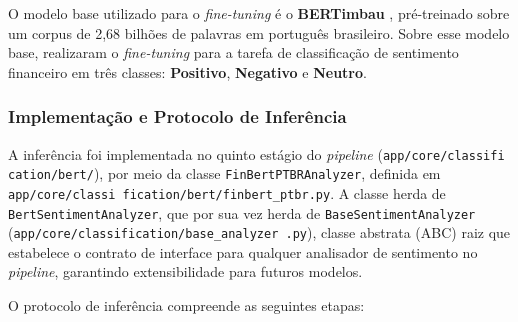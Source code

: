O modelo base utilizado para o \textit{fine-tuning} é o \textbf{BERTimbau} \cite{souza2020}, pré-treinado sobre um corpus de 2,68 bilhões de palavras em português brasileiro. Sobre esse modelo base,  realizaram o \textit{fine-tuning} para a tarefa de classificação de sentimento financeiro em três classes: \textbf{Positivo}, \textbf{Negativo} e \textbf{Neutro}.

\subsubsection{Implementação e Protocolo de Inferência}
\label{subsubsec:protocolo_inferencia}

A inferência foi implementada no quinto estágio do \textit{pipeline} (\texttt{app/core/classifi cation/bert/}), por meio da classe \texttt{FinBertPTBRAnalyzer}, definida em \texttt{app/core/classi fication/bert/finbert\_ptbr.py}. A classe herda de \texttt{BertSentimentAnalyzer}, que por sua vez herda de \texttt{BaseSentimentAnalyzer} (\texttt{app/core/classification/base\_analyzer .py}), classe abstrata (ABC) raiz que estabelece o contrato de interface para qualquer analisador de sentimento no \textit{pipeline}, garantindo extensibilidade para futuros modelos.

O protocolo de inferência compreende as seguintes etapas:

